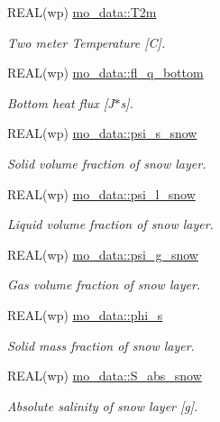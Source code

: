 \begin{DoxyCompactItemize}
REAL(wp) \hyperlink{namespacemo__data_a987a45ea7aa457299f91119864d0baff}{mo\_\-data::T2m}
\begin{DoxyCompactList}\small\item\em Two meter Temperature \mbox{[}C\mbox{]}. \item\end{DoxyCompactList}\item 
REAL(wp) \hyperlink{namespacemo__data_acd16d86818624a2eb95bfed83a2a1d76}{mo\_\-data::fl\_\-q\_\-bottom}
\begin{DoxyCompactList}\small\item\em Bottom heat flux \mbox{[}J$\ast$s\mbox{]}. \item\end{DoxyCompactList}\item 
REAL(wp) \hyperlink{namespacemo__data_a05df5047190129b7388a1ad5804ef145}{mo\_\-data::psi\_\-s\_\-snow}
\begin{DoxyCompactList}\small\item\em Solid volume fraction of snow layer. \item\end{DoxyCompactList}\item 
REAL(wp) \hyperlink{namespacemo__data_a914d1e046ed2bfa66d84f8aecb2ed26f}{mo\_\-data::psi\_\-l\_\-snow}
\begin{DoxyCompactList}\small\item\em Liquid volume fraction of snow layer. \item\end{DoxyCompactList}\item 
REAL(wp) \hyperlink{namespacemo__data_a2ca2bd9402672a8327e4a68b3a14fd7f}{mo\_\-data::psi\_\-g\_\-snow}
\begin{DoxyCompactList}\small\item\em Gas volume fraction of snow layer. \item\end{DoxyCompactList}\item 
REAL(wp) \hyperlink{namespacemo__data_aee41245a2d1d08be740021dfc14cf723}{mo\_\-data::phi\_\-s}
\begin{DoxyCompactList}\small\item\em Solid mass fraction of snow layer. \item\end{DoxyCompactList}\item 
REAL(wp) \hyperlink{namespacemo__data_afacea50e8d2e4a7725adb27d613ca4c3}{mo\_\-data::S\_\-abs\_\-snow}
\begin{DoxyCompactList}\small\item\em Absolute salinity of snow layer \mbox{[}g\mbox{]}. \item\end{DoxyCompactList}\item 

\end{DoxyCompactItemize}
